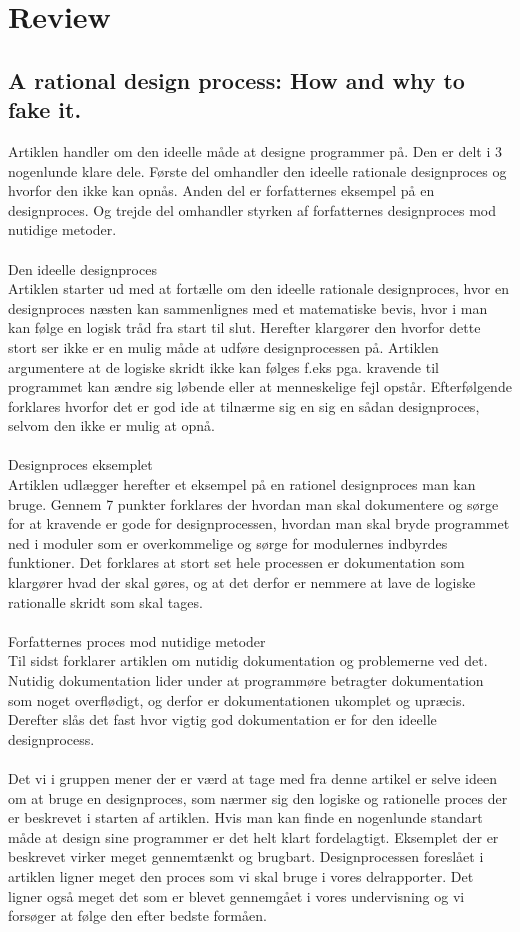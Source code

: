 \documentclass[12pt]{article}
\begin{document}
\section{Review}
\subsection{A rational design process: How and why to fake it.}

Artiklen handler om den ideelle måde at designe programmer på. Den er delt i 3 nogenlunde klare dele. Første del omhandler den ideelle rationale designproces og hvorfor den ikke kan opnås. Anden del er forfatternes eksempel på en designproces. Og trejde del omhandler styrken af forfatternes designproces mod nutidige metoder.\\\\
Den ideelle designproces\\
Artiklen starter ud med at fortælle om den ideelle rationale designproces, hvor en designproces næsten kan sammenlignes med et matematiske bevis, hvor i man kan følge en logisk tråd fra start til slut. Herefter klargører den hvorfor dette stort ser ikke er en mulig måde at udføre designprocessen på. Artiklen argumentere at de logiske skridt ikke kan følges f.eks pga. kravende til programmet kan ændre sig løbende eller at menneskelige fejl opstår. Efterfølgende forklares hvorfor det er god ide at tilnærme sig en sig en sådan designproces, selvom den ikke er mulig at opnå.\\\\
Designproces eksemplet\\
Artiklen udlægger herefter et eksempel på en rationel designproces man kan bruge. Gennem 7 punkter forklares der hvordan man skal dokumentere og sørge for at kravende er gode for designprocessen, hvordan man skal bryde programmet ned i moduler som er overkommelige og sørge for modulernes indbyrdes funktioner. Det forklares at stort set hele processen er dokumentation som klargører hvad der skal gøres, og at det derfor er nemmere at lave de logiske rationalle skridt som skal tages.\\\\
Forfatternes proces mod nutidige metoder\\
Til sidst forklarer artiklen om nutidig dokumentation og problemerne ved det. Nutidig dokumentation lider under at programmøre betragter dokumentation som noget overflødigt, og derfor er dokumentationen ukomplet og upræcis. Derefter slås det fast hvor vigtig god dokumentation er for den ideelle designprocess.\\\\
Det vi i gruppen mener der er værd at tage med fra denne artikel er selve ideen om at bruge en designproces, som nærmer sig den logiske og rationelle proces der er beskrevet i starten af artiklen. Hvis man kan finde en nogenlunde standart måde at design sine programmer er det helt klart fordelagtigt. Eksemplet der er beskrevet virker meget gennemtænkt og brugbart. Designprocessen foreslået i artiklen ligner meget den proces som vi skal bruge i vores delrapporter. Det ligner også meget det som er blevet gennemgået i vores undervisning og vi forsøger at følge den efter bedste formåen.
\end{document}
